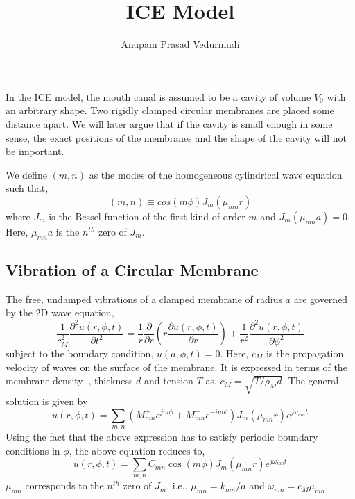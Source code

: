 \documentclass[a4paper,10pt]{article}
\title{ICE Model }
\author{Anupam Prasad Vedurmudi}
\date{}
\begin{document}
\maketitle
In the ICE model, the mouth canal is assumed to be a cavity of volume $V_0$ 
with an arbitrary shape. Two rigidly clamped circular membranes are placed some distance
apart. We will later argue that if the cavity is small enough in some sense, 
the exact positions of the membranes and the shape of the cavity will not be 
important.

We define $(m,n)$ as the modes of the homogeneous cylindrical wave equation such that,
\begin{equation}\label{CylindricalHarmonic}
 (m,n)\equiv cos(m\phi)J_m\left(\mu_{mn}r\right)
\end{equation}
where $J_m$ is the Bessel function of the first kind of order $m$ and $J_m\left(\mu_{mn}a\right)=0$. 
Here, $\mu_{mn}a$ is the $n^{th}$ zero of $J_m$. 

\subsection{Vibration of a Circular Membrane}
The free, undamped vibrations of a clamped membrane of radius $a$ are governed by the 2D wave equation,
\begin{equation}\label{membrane1}
  \frac{1}{c_M^2}\frac{\partial^2u(r,\phi,t)}{\partial t^2}=\frac{1}{r}\frac{\partial}{\partial r}\left(r\frac{\partial u(r,\phi,t)}{\partial r}\right)+
 \frac{1}{r^2}\frac{\partial^2 u(r,\phi,t)}{\partial \phi^2}
\end{equation}
subject to the boundary condition, $u(a,\phi,t)=0$. Here, $c_M$ is the propagation velocity
of waves on the surface of the membrane. It is expressed in terms of the membrane density $\	$, thickness $d$ and tension $T$ as, 
$c_M=\sqrt{T/\rho_M d}$. The general solution is given by
\begin{equation}
 u(r,\phi,t)=\sum_{m,n}\left(M^+_{mn}e^{jm\phi}+M^-_{mn}e^{-im\phi}\right)J_m(\mu_{mn}r)e^{j\omega_{mn}t}
\end{equation}
Using the fact that the above expression has to satisfy periodic boundary conditions in $\phi$, the
above equation reduces to, 
\begin{equation}\label{membranegeneral}
 u(r,\phi,t)=\sum_{m,n}C_{mn}\cos(m\phi)J_m(\mu_{mn}r)e^{j\omega_{mn}t}
\end{equation}
$\mu_{mn}$ corresponds to the $n^{th}$ zero of $J_m$, i.e., $\mu_{mn}=k_{mn}/a$  and $\omega_{mn}=c_M\mu_{mn}$.
\end{document}

